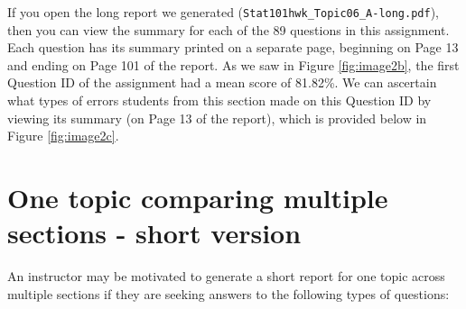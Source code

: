 \documentclass[11pt,a4paper,oldfontcommands,openany]{memoir}
\numberwithin{equation}{section} %
\begin{document}
If you open the long report we generated (\texttt{Stat101hwk\_Topic06\_A-long.pdf}), then you can view the summary for each of the 89 questions in this assignment. Each question has its summary printed on a separate page, beginning on Page 13 and ending on Page 101 of the report. As we saw in Figure \ref{fig:image2b}, the first Question ID of the assignment had a mean score of 81.82\%. We can ascertain what types of errors students from this section made on this Question ID by viewing its summary (on Page 13 of the report), which is provided below in Figure \ref{fig:image2c}. 

\begin{center}
\captionsetup{width=\textwidth}
\label{fig:image2c}
\end{center}

\section{One topic comparing multiple sections - short version}

An instructor may be motivated to generate a short report for one topic across multiple sections if they are seeking answers to the following types of questions:
\end{document}
